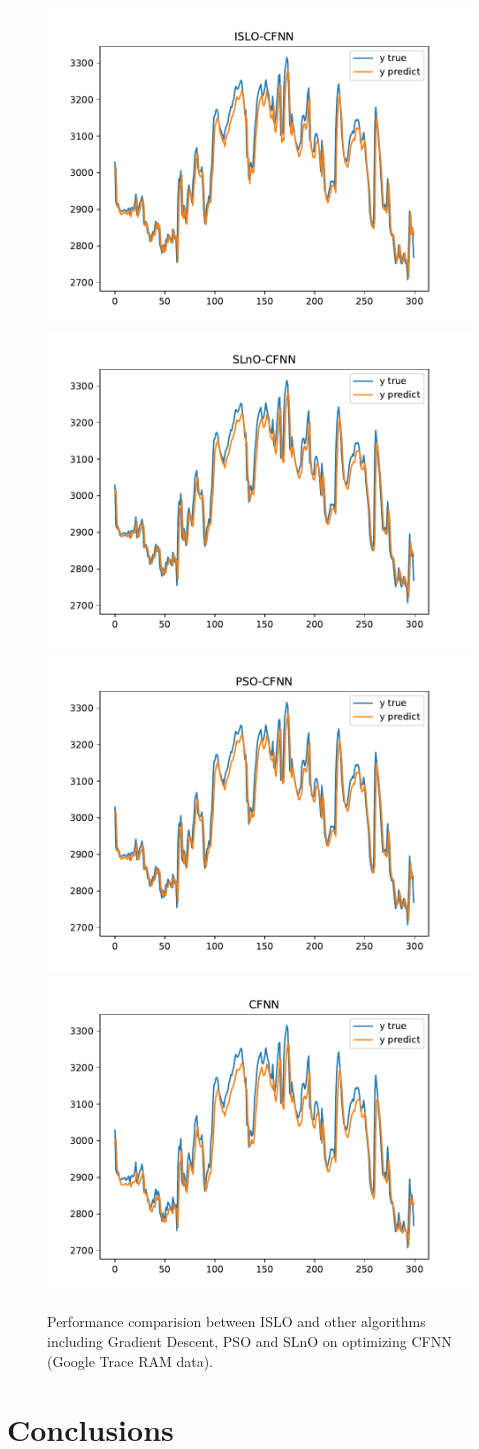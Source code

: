 \documentclass[a4paper,13pt,2p]{report}
\begin{document}
\begin{figure}[!ht] 
   \centering
   	\includegraphics[width=0.49\linewidth]{pdf/result_data/ram/ISLO_CFNN_ram}
  	 \includegraphics[width=0.49\linewidth]{pdf/result_data/ram/SLnO_CFNN_ram}
  	 \includegraphics[width=0.49\linewidth]{pdf/result_data/ram/PSO_CFNN_ram}
  	 \includegraphics[width=0.49\linewidth]{pdf/result_data/ram/CFNN-1H_ram}
	
  \caption{Performance comparision between ISLO and other algorithms including Gradient Descent, PSO and SLnO on optimizing CFNN (Google Trace RAM data).} 
  \label{fig_result_ram} 
\end{figure}

\chapter{Conclusions}

\appendix



%
%
\end{document}
